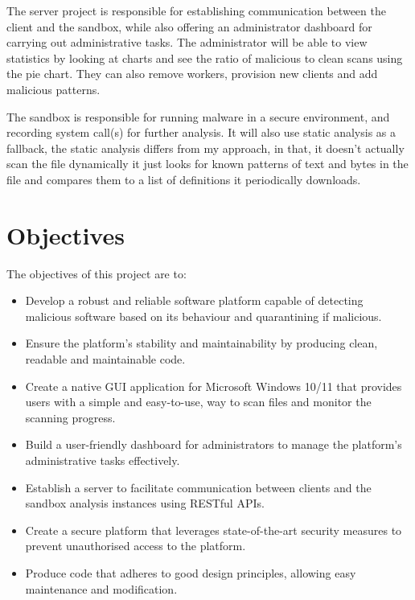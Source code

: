 The server project is responsible for establishing communication
between the client and the sandbox,
while also offering an administrator dashboard
for carrying out administrative tasks.
The administrator will be able to view statistics by looking at charts
and see the ratio of malicious to clean scans using the pie chart.
They can also remove workers, provision new clients and add malicious patterns.

The sandbox is responsible for running malware in a secure environment,
and recording system call(s) for further analysis.
It will also use static analysis as a fallback,
the static analysis differs from my approach,
in that, it doesn't actually scan the file dynamically
it just looks for known patterns of text and bytes in the file
and compares them to a list of definitions it periodically downloads.


\section{Objectives}
The objectives of this project are to:
\begin{itemize}
\item Develop a robust and reliable software platform capable of detecting
      malicious software based on its behaviour and quarantining if malicious.
\item Ensure the platform's stability and maintainability by producing clean,
      readable and maintainable code.
\item Create a native GUI application for Microsoft Windows 10/11
      that provides users with a simple and easy-to-use,
      way to scan files and monitor the scanning progress.
\item Build a user-friendly dashboard for administrators to manage
      the platform's administrative tasks effectively.
\item Establish a server to facilitate communication between
      clients and the sandbox analysis instances using RESTful APIs.
\item Create a secure platform that leverages state-of-the-art security
      measures to prevent unauthorised access to the platform.
\item Produce code that adheres to good design principles,
      allowing easy maintenance and modification.
\end{itemize}

